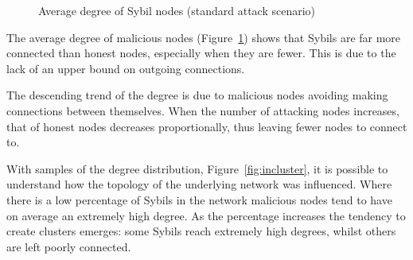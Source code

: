 \begin{figure}[ht]
\begin{minipage}[b]{0.5\linewidth}
			\centering
			\caption{Average degree of Sybil nodes (standard attack scenario)}
			\label{fig:in-atk-degree}
        \end{minipage}
    \end{figure}
    
The average degree of malicious nodes (Figure~\ref{fig:in-atk-degree}) shows that Sybils are far more connected than honest nodes, especially when they are fewer. This is due to the lack of an upper bound on outgoing connections.

The descending trend of the degree is due to malicious nodes avoiding making connections between themselves. When the number of attacking nodes increases, that of honest nodes decreases proportionally, thus leaving fewer nodes to connect to.

With samples of the degree distribution, Figure~\ref{fig:incluster}, it is possible to understand how the topology of the underlying network was influenced.  Where there is a low percentage of Sybils in the network malicious nodes tend to have on average an extremely high degree. As the percentage increases the tendency to create clusters emerges: some Sybils reach extremely high degrees, whilst others are left poorly connected.\par



